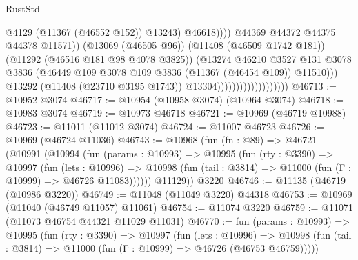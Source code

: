 \begin{lexlean}{RustStd}
\begin{coremodule}
                                                          @4129
                                                          (@11367 (@46552 @152))
                                                          @13243)
                                                        @46618))))
                                                @44369
                                                @44372
                                                @44375
                                                @44378
                                                @11571))
                                            (@13069 (@46505 @96))
                                            (@11408 (@46509 @1742 @181))
                                            (@11292 (@46516 @181 @98 @4078 @3825))
                                            (@13274
                                              @46210
                                              @3527
                                              @131
                                              @3078
                                              @3836
                                              (@46449
                                                @109
                                                @3078
                                                @109
                                                @3836
                                                (@11367 (@46454 @109))
                                                @11510)))
                                          @13292
                                          (@11408 (@23710 @3195 @1743))
                                          @13304)))))))))))))))))))
@46713 := @10952 @3074
@46717 := @10954 (@10958 @3074) (@10964 @3074)
@46718 := @10983 @3074
@46719 := @10973 @46718
@46721 := @10969 (@46719 @10988)
@46723 := @11011 (@11012 @3074)
@46724 := @11007 @46723
@46726 := @10969 (@46724 @11036)
@46743 := @10968
    (fun (fn : @89) =>
    @46721
      (@10991
        (@10994
          (fun (params : @10993) =>
          @10995
            (fun (rty : @3390) =>
            @10997
              (fun (lets : @10996) =>
              @10998 (fun (tail : @3814) => @11000 (fun (Γ : @10999) => @46726 @11083))))))
        @11129))
    @3220
@46746 := @11135 (@46719 (@10986 @3220))
@46749 := @11048 (@11049 @3220) @44318
@46753 := @10969 (@11040 (@46749 @11057) @11061)
@46754 := @11074 @3220
@46759 := @11071 (@11073 @46754 @44321 @11029 @11031)
@46770 := fun (params : @10993) =>
  @10995
    (fun (rty : @3390) =>
    @10997
      (fun (lets : @10996) =>
      @10998 (fun (tail : @3814) => @11000 (fun (Γ : @10999) => @46726 (@46753 @46759)))))

\end{coremodule}
\end{lexlean}
